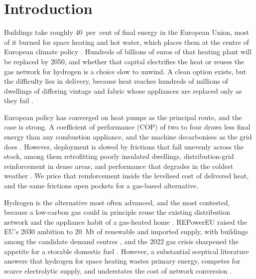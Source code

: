 \section{Introduction}
\label{sec:intro}

Buildings take roughly 40~per~cent of final energy in the European Union, most of it
burned for space heating and hot water, which places them at the centre of European
climate policy \citep{IEA2022buildings,EuropeanCommission2020GreenDeal}. Hundreds of
billions of euros of that heating plant will be replaced by 2050, and whether that capital
electrifies the heat or reuses the gas network for hydrogen is a choice slow to unwind. A
clean option exists, but the difficulty lies in delivery, because heat reaches
hundreds of millions of dwellings of differing vintage and fabric whose appliances are
replaced only as they fail \citep{Azevedo2022,Chatterjee2024Navigating}.

European policy has converged on heat pumps as the principal route, and the case is strong.
A coefficient of performance (COP) of two to four draws less final energy than any combustion
appliance, and the machine decarbonises as the grid does
\citep{IEA2022heatpumps,Abbasi2021}. However, deployment is slowed by frictions that fall
unevenly across the stock, among them retrofitting poorly insulated dwellings,
distribution-grid reinforcement in dense areas, and performance that degrades in the
coldest weather \citep{Lingard2020Residential,Gibb2023Coming}. We price that reinforcement
inside the levelised cost of delivered heat, and the same frictions open pockets for a
gas-based alternative.

Hydrogen is the alternative most often advanced, and the most contested, because a
low-carbon gas could in principle reuse the existing distribution network and the
appliance habit of a gas-heated home \citep{Dodds2015,Bothe2021}. REPowerEU raised the EU's 2030 ambition to 20~Mt of renewable and imported supply, with
buildings among the candidate demand centres
\citep{REpowerEU2022,EUCommissionSWD2022}, and the 2022 gas crisis sharpened the
appetite for a storable domestic fuel \citep{Goldthau2023Eu}. However, a substantial
sceptical literature answers that hydrogen for space heating wastes primary energy,
competes for scarce electrolytic supply, and understates the cost of network conversion
\citep{Rosenow2022PipeDream,Rosenow2024MetaReview,Cebon2022,Badakhsh2023Caveats,ICCT2023h2heating}.

